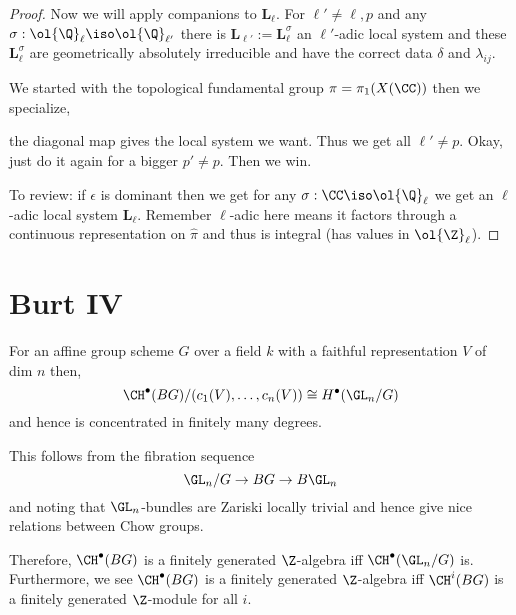 \documentclass{article}
\newcommand{\Qbar}{\ol{\Q}}
\newcommand{\LL}{\mathbf{L}}
\begin{document}
\begin{proof}
\par 
Now we will apply companions to $\LL_{\ell}$. For $\ell' \neq \ell,p$ and any $\sigma : \Qbar_{\ell} \iso \Qbar_{\ell'}$ there is $\LL_{\ell'} := \LL^{\sigma}_{\ell}$ an $\ell'$-adic local system and these $\LL^{\sigma}_{\ell}$ are geometrically absolutely irreducible and have the correct data $\delta$ and $\lambda_{ij}$.
\par 
We started with the topological fundamental group $\pi = \pi_1(X(\CC))$ then we specialize,
\begin{center}
\end{center}
the diagonal map gives the local system we want. Thus we get all $\ell' \neq p$. Okay, just do it again for a bigger $p' \neq p$. Then we win.
\par 
To review: if $\epsilon$ is dominant then we get for any $\sigma : \CC \iso \Qbar_{\ell}$ we get an $\ell$-adic local system $\LL_{\ell}$. Remember $\ell$-adic here means it factors through a continuous representation on $\hat{\pi}$ and thus is integral (has values in $\ol{\Z}_\ell$).  
\end{proof}

\section{Burt IV}

\begin{theorem}[T, 2019]
For an affine group scheme $G$ over a field $k$ with a faithful representation $V$ of dim $n$ then,
\[ \CH^\bullet(BG) / (c_1(V), \dots, c_n(V)) \cong H^\bullet(\GL_n / G) \]
and hence is concentrated in finitely many degrees. 
\end{theorem}

This follows from the fibration sequence
\[ \GL_n / G \to B G \to B \GL_n \]
and noting that $\GL_n$-bundles are Zariski locally trivial and hence give nice relations between Chow groups. 

\begin{rmk}
Therefore, $\CH^\bullet(BG)$ is a finitely generated $\Z$-algebra iff $\CH^\bullet(\GL_n / G)$ is. Furthermore, we see $\CH^\bullet(BG)$ is a finitely generated $\Z$-algebra iff $\CH^i(BG)$ is a finitely generated $\Z$-module for all $i$.
\end{rmk}
\end{document}
